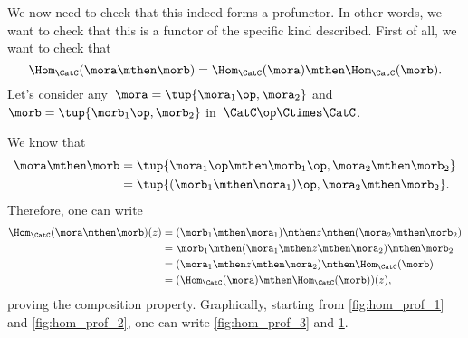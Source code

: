 
We now need to check that this indeed forms a profunctor.
In other words, we want to check that this is a functor of the specific kind described.
First of all, we want to check that
%
\begin{equation}
	\label{eq:hom5}
	\Hom_\CatC(\mora \mthen \morb)=\Hom_\CatC(\mora)\mthen \Hom_\CatC(\morb).
\end{equation}
Let's consider any~$\mora=\tup{\mora_1\op, \mora_2}$ and~$\morb=\tup{\morb_1\op,\morb_2}$ in~$\CatC\op \Ctimes \CatC$.

We know that
\begin{equation}
	\label{eq:hom6}
	\begin{aligned}
		\mora\mthen \morb & =\tup{\mora_1\op \mthen \morb_1\op, \mora_2\mthen \morb_2} \\
		                  & =\tup{(\morb_1\mthen \mora_1)\op, \mora_2\mthen \morb_2}.
	\end{aligned}
\end{equation}
Therefore, one can write
\begin{equation}
	\label{eq:hom7}
	\begin{aligned}
		\Hom_\CatC(\mora \mthen \morb)(z) & =(\morb_1\mthen \mora_1)\mthen z \mthen (\mora_2\mthen \morb_2) \\
		                                  & =\morb_1\mthen (\mora_1\mthen z \mthen \mora_2) \mthen \morb_2  \\
		                                  & =(\mora_1\mthen z \mthen \mora_2)\mthen \Hom_\CatC(\morb)       \\
		                                  & =(\Hom_\CatC(\mora)\mthen \Hom_\CatC(\morb))(z),
	\end{aligned}
\end{equation}
proving the composition property.
Graphically, starting from \cref{fig:hom_prof_1} and \cref{fig:hom_prof_2}, one can write \cref{fig:hom_prof_3} and \cref{fig:hom_prof_4}.

\begin{marginfigure}
	\centering
	\caption{\label{fig:hom_prof_1}}
\end{marginfigure}
\begin{marginfigure}
	\centering
	\caption{\label{fig:hom_prof_2}}
\end{marginfigure}
\begin{marginfigure}
	\centering
	\caption{\label{fig:hom_prof_3}}
\end{marginfigure}
\begin{figure}[h!]
	\centering
	\caption{\label{fig:hom_prof_4}}
\end{figure}

